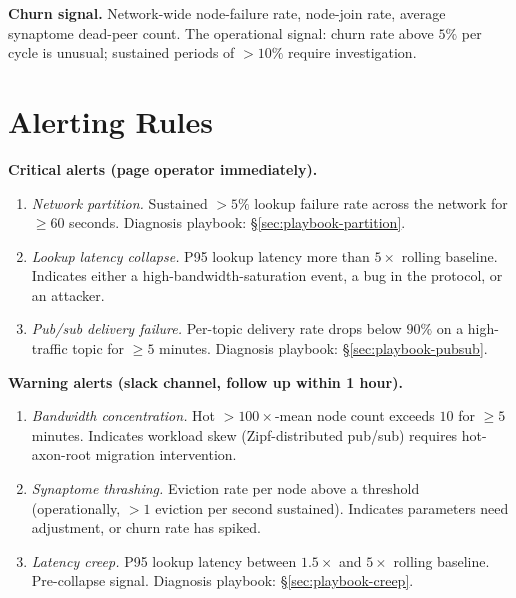 \documentclass[twoside,nobib]{tufte-book}
\begin{document}
\textbf{Churn signal.} Network-wide node-failure rate, node-join
rate, average synaptome dead-peer count. The operational signal:
churn rate above $5\%$ per cycle is unusual; sustained periods
of $> 10\%$ require investigation.

\section{Alerting Rules}

\textbf{Critical alerts (page operator immediately).}

\begin{enumerate}\setlength\itemsep{0.1em}
  \item \emph{Network partition.} Sustained $> 5\%$ lookup
    failure rate across the network for $\geq 60$ seconds.
    Diagnosis playbook: \S\ref{sec:playbook-partition}.
  \item \emph{Lookup latency collapse.} P95 lookup latency more
    than $5\times$ rolling baseline. Indicates either a
    high-bandwidth-saturation event, a bug in the protocol,
    or an attacker.
  \item \emph{Pub/sub delivery failure.} Per-topic delivery rate
    drops below $90\%$ on a high-traffic topic for $\geq 5$
    minutes. Diagnosis playbook: \S\ref{sec:playbook-pubsub}.
\end{enumerate}

\textbf{Warning alerts (slack channel, follow up within 1 hour).}

\begin{enumerate}\setlength\itemsep{0.1em}
  \item \emph{Bandwidth concentration.} Hot $>100\times$-mean
    node count exceeds $10$ for $\geq 5$ minutes. Indicates
    workload skew (Zipf-distributed pub/sub) requires
    hot-axon-root migration intervention.
  \item \emph{Synaptome thrashing.} Eviction rate per node above
    a threshold (operationally, $> 1$ eviction per second
    sustained). Indicates parameters need adjustment, or churn
    rate has spiked.
  \item \emph{Latency creep.} P95 lookup latency between $1.5\times$
    and $5\times$ rolling baseline. Pre-collapse signal.
    Diagnosis playbook: \S\ref{sec:playbook-creep}.
\end{enumerate}
\end{document}
